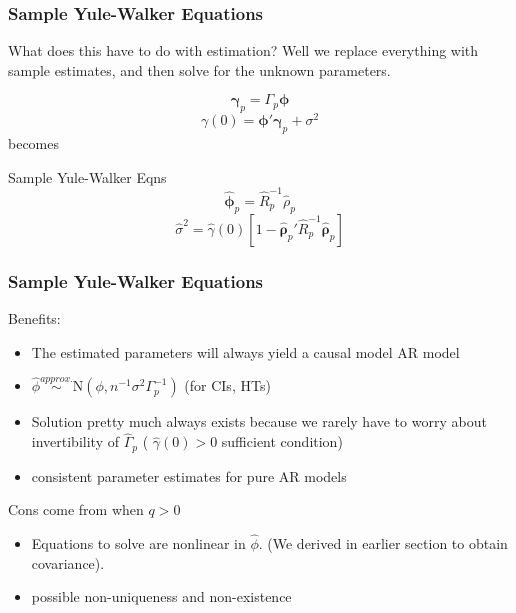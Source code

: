 \documentclass{beamer}
\begin{document}
\begin{frame}
\frametitle{Sample Yule-Walker Equations}

What does this have to do with estimation? Well we replace everything with sample estimates, and then solve for the unknown parameters. 

\[
\bm{\gamma}_p = \Gamma_p \bm{\phi}
\]
\[
\gamma(0) = \bm{\phi}'\bm{\gamma}_p + \sigma^2
\]
becomes
\begin{block}{Sample Yule-Walker Eqns}
\[
\hat{\bm{\phi}}_p = \hat{R}^{-1}_p\hat{\rho}_p
\]
\[
\hat{\sigma}^2 = \hat{\gamma}(0)[1 - \hat{\bm{\rho}}_p' \hat{R}^{-1}_p \hat{\bm{\rho}}_p]
\]
\end{block}
\end{frame}


\begin{frame}
\frametitle{Sample Yule-Walker Equations}

Benefits:
\begin{itemize}
\item The estimated parameters will always yield a causal model AR model
\item $\hat{\phi} \overset{approx.}{\sim} \text{N}(\phi, n^{-1}\sigma^2 \Gamma_p^{-1})$ (for CIs, HTs)
\item Solution pretty much always exists because we rarely have to worry about invertibility of $\hat{\Gamma}_p$ ( $\hat{\gamma}(0) > 0$ sufficient condition)
\item consistent parameter estimates for pure AR models
\end{itemize}

Cons come from when $q > 0$
\begin{itemize}
\item Equations to solve are nonlinear in $\hat{\phi}$. (We derived in earlier section to obtain covariance).
\item possible non-uniqueness and non-existence
\end{itemize}


\end{frame}

\end{document}
